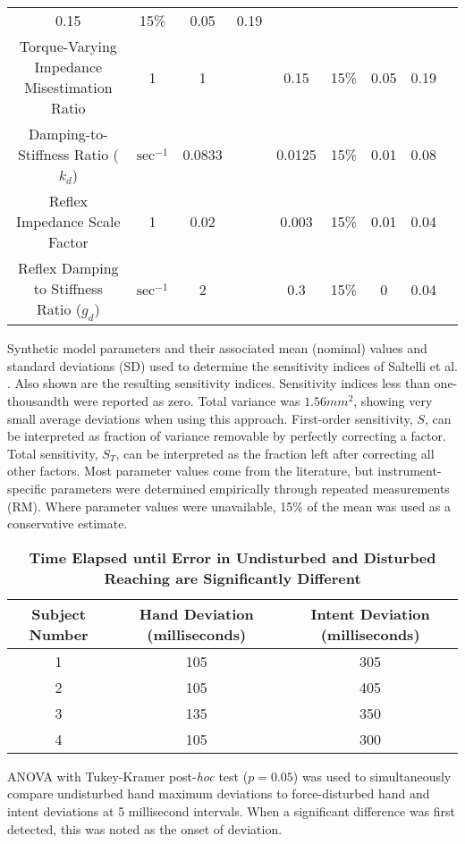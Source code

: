 \begin{table}[!ht]
\begin{tabular}{|c|c|c c|c c|c c|c|}
0.15 &
15\% &
0.05 &
0.19 \\
Torque-Varying Impedance Misestimation Ratio &
1 &
1 &
\cite{burdet2006stability} &
0.15 &
15\% &
0.05 &
0.19 \\
Damping-to-Stiffness Ratio ($k_d$) &
$\text{sec}^{-1}$ &
0.0833 &
\cite{burdet2006stability} &
0.0125 &
15\% &
0.01 &
0.08 \\
Reflex Impedance Scale Factor &
1 &
0.02 &
\cite{burdet2006stability} &
0.003 &
15\% &
0.01 &
0.04 \\
Reflex Damping to Stiffness Ratio ($g_d$) &
$\text{sec}^{-1}$ &
2 &
\cite{burdet2006stability} &
0.3 &
15\% &
0 &
0.04 \\ \hline
\end{tabular}
\begin{flushleft}Synthetic model parameters and their associated mean (nominal) values and standard deviations (SD) used to determine the sensitivity indices of Saltelli et al. \cite{saltelli2010variance}. Also shown are the resulting sensitivity indices. Sensitivity indices less than one-thousandth were reported as zero. Total variance was $1.56 mm^2$, showing very small average deviations when using this approach. First-order sensitivity, $S$, can be interpreted as fraction of variance removable by perfectly correcting a factor. Total sensitivity, $S_T$, can be interpreted as the fraction left after correcting all other factors. Most parameter values come from the literature, but instrument-specific parameters were determined empirically through repeated measurements (RM). Where parameter values were unavailable, 15\% of the mean was used as a conservative estimate.
\end{flushleft}
\label{tab:parameters}
\end{table}

\begin{table}[!ht]
\caption{
\bf{Time Elapsed until Error in Undisturbed and Disturbed Reaching are Significantly Different}}
\begin{tabular}{|c|c|c|}
\hline
Subject Number &
Hand Deviation (milliseconds) &
Intent Deviation (milliseconds) \\ \hline
1 &
105 &
305 \\
2 &
105 &
405 \\
3 &
135 &
350 \\
4 &
105 &
300 \\ \hline
\end{tabular}
\begin{flushleft} ANOVA with Tukey-Kramer post-\textit{hoc} test ($p=0.05$) was used to simultaneously compare undisturbed hand maximum deviations to force-disturbed hand and intent deviations at 5 millisecond intervals. When  a significant difference was first detected, this was noted as the onset of deviation.
\end{flushleft}
\label{tab:onsets}
\end{table}

